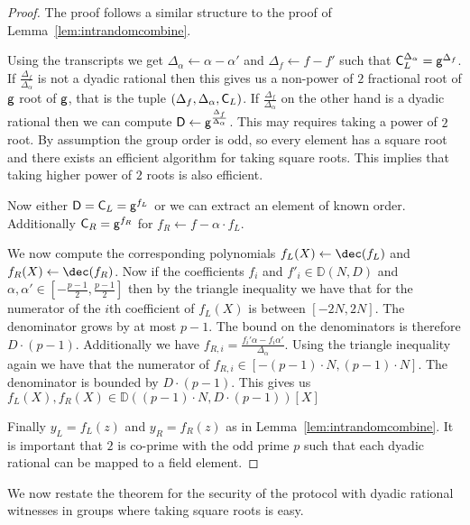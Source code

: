 \begin{proof}
The proof follows a similar structure to the proof of Lemma~\ref{lem:intrandomcombine}. 
		
	Using the transcripts we get $\Delta_\alpha\gets\alpha-\alpha'$ and $\Delta_f\gets f-f'$ such that $\mathsf{C}_{L}^{\Delta_\alpha}=\mathsf{g}^{\Delta_f}$. 
 If $\frac{\Delta_f}{\Delta_\alpha}$ is not a dyadic rational then this gives us a non-power of $2$ fractional root of $\mathsf{g}$ root of $\mathsf{g}$, that is the tuple $(\Delta_f,\Delta_\alpha,\mathsf{C}_{L})$.  
 If $\frac{\Delta_f}{\Delta_\alpha}$ on the other hand is a dyadic rational then we can compute $\mathsf{D}\gets\mathsf{g}^{\frac{\Delta_f}{\Delta_\alpha}}$. This may requires taking a power of $2$ root. By assumption the group order is odd, so every element has a square root and there exists an efficient algorithm for taking square roots. This implies that taking higher power of $2$ roots is also efficient.
  
  Now either $\mathsf{D} = \mathsf{C}_L=\mathsf{g}^{f_L}$ or we can extract an element of known order. Additionally $\mathsf{C}_R=\mathsf{g}^{f_R}$ for $f_R\gets f-\alpha \cdot f_L$.

 We now compute the corresponding polynomials $f_L(X)\gets \dec(f_L)$ and $f_R(X)\gets \dec(f_R)$.
Now if the coefficients $f_i$ and $f'_i\in \mathbb{D}(N,D)$ and $\alpha,\alpha' \in [-\frac{p-1}{2},\frac{p-1}{2}]$ then by the triangle inequality we have that for the numerator of the $i$th coefficient of $f_L(X)$ is between $[-2N,2N]$. The denominator grows by at most $p-1$. The bound on the denominators is therefore $D\cdot (p-1)$. Additionally we have $f_{R,i}=\frac{f_i'\alpha-f_i \alpha'}{\Delta_\alpha}$. Using the triangle inequality again we have that the numerator of $f_{R,i} \in [-(p-1) \cdot N, (p-1) \cdot N]$. The denominator is bounded by $D\cdot (p-1)$. This gives us $f_L(X),f_R(X)\in \mathbb{D}((p-1) \cdot N,D\cdot (p-1))[X]$

Finally $y_L=f_L(z)$ and $y_R=f_R(z)$ as in Lemma~\ref{lem:intrandomcombine}. It is important that $2$ is co-prime with the odd prime $p$ such that each dyadic rational can be mapped to a field element.
\end{proof}


We now restate the theorem for the security of the protocol with dyadic rational witnesses in groups where taking square roots is easy.

\def\thetheorem{\ref{thm:dyadicpolysecurity}}
\begin{theorem}
\dyadicmaintheorem
\end{theorem}

